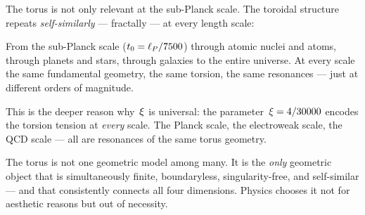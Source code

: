 The torus is not only relevant at the sub-Planck scale. The toroidal structure repeats \emph{self-similarly} --- fractally --- at every length scale:

From the sub-Planck scale ($t_0 = \ell_P / 7500$) through atomic nuclei and atoms, through planets and stars, through galaxies to the entire universe. At every scale the same fundamental geometry, the same torsion, the same resonances --- just at different orders of magnitude.

This is the deeper reason why~$\xi$ is universal: the parameter~$\xi = 4/30000$ encodes the torsion tension at \emph{every} scale. The Planck scale, the electroweak scale, the QCD scale --- all are resonances of the same torus geometry.

\begin{kerngedanke}
The torus is not one geometric model among many. It is the \emph{only} geometric object that is simultaneously finite, boundaryless, singularity-free, and self-similar --- and that consistently connects all four dimensions. Physics chooses it not for aesthetic reasons but out of necessity.
\end{kerngedanke}
